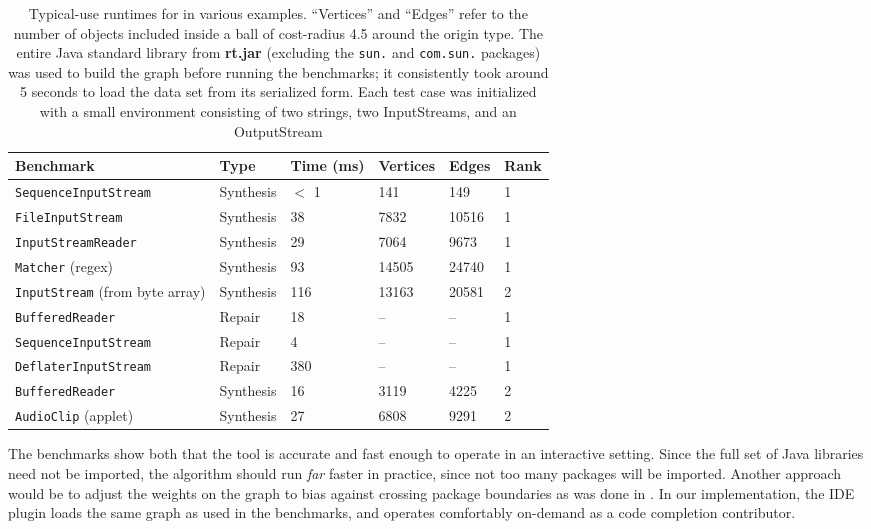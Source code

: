 \begin{table*}[t]
  \centering
  \renewcommand{\arraystretch}{1.25}
  \begin{tabularx}{\textwidth}{| X | l | l | l | l | l |}
    \hline
    \textbf{Benchmark} & \textbf{Type} & \textbf{Time (ms)} & \textbf{Vertices} & \textbf{Edges} & \textbf{Rank} \\ \hline
	\texttt{SequenceInputStream} & Synthesis & $<$ 1 & 141   & 149   & 1 \\ \hline
    \texttt{FileInputStream}     & Synthesis & 38  & 7832  & 10516 & 1 \\ \hline
    \texttt{InputStreamReader}   & Synthesis & 29  & 7064  & 9673  & 1 \\ \hline
    \texttt{Matcher} (regex)     & Synthesis & 93  & 14505 & 24740 & 1 \\ \hline
    \texttt{InputStream} (from byte array) & Synthesis & 116 & 13163  & 20581  & 2 \\ \hline
    \texttt{BufferedReader}      & Repair    & 18  & --    & --    & 1 \\ \hline
    \texttt{SequenceInputStream} & Repair    & 4   & --    & --    & 1 \\ \hline
    \texttt{DeflaterInputStream} & Repair & 380 & -- & -- & 1 \\ \hline
    \texttt{BufferedReader}      & Synthesis & 16  & 3119  & 4225  & 2 \\ \hline
    \texttt{AudioClip} (applet)  & Synthesis & 27  & 6808  & 9291  & 2 \\ \hline
  \end{tabularx}
  \caption{Typical-use runtimes for \ourTool in various
    examples. ``Vertices'' and ``Edges'' refer to the number of
    objects included inside a ball of cost-radius 4.5 around the
    origin type. The entire Java standard library from \textbf{rt.jar}
    (excluding the \texttt{sun.} and \texttt{com.sun.} packages) was
    used to build the graph before running the benchmarks; it
    consistently took around 5 seconds to load the data set from its
    serialized form. Each test case was initialized with a small
    environment consisting of two strings, two InputStreams, and an
    OutputStream}
  \label{eval:runtime}
\end{table*}

The benchmarks show both that the tool is accurate and fast enough to
operate in an interactive setting. Since the full set of Java
libraries need not be imported, the algorithm should run \textit{far}
faster in practice, since not too many packages will be
imported. Another approach would be to adjust the weights on the graph
to bias against crossing package boundaries as was done in
\cite{MandelinetALL2005Jungloid}. In our implementation, the IDE
plugin loads the same graph as used in the benchmarks, and operates
comfortably on-demand as a code completion contributor.

